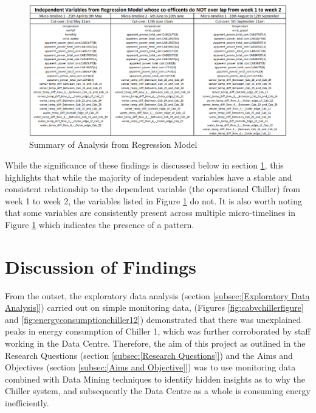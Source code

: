 \documentclass[12pt]{scrartcl}
\begin{document}
\begin{figure}[H]
  \caption{Summary of Analysis from Regression Model}
  \label{fig:regressionresults}
  \centering
    \includegraphics[scale=0.50]{regressionresults}
\end{figure}   

While the significance of these findings is discussed below in section \ref{sec:[Discussion of Findings]}, this highlights that while the majority of independent variables have a stable and consistent relationship to the dependent variable (the operational Chiller) from week 1 to week 2, the variables listed in Figure \ref{fig:regressionresults} do not. It is also worth noting that some variables are consistently present across multiple micro-timelines in Figure \ref{fig:regressionresults} which indicates the presence of a pattern.              

\section{Discussion of Findings}
\label{sec:[Discussion of Findings]}

From the outset, the exploratory data analysis (section \ref{subsec:[Exploratory Data Analysis]}) carried out on simple monitoring data, (Figures \ref{fig:cabvchillerfigure} and \ref{fig:energyconsumptionchiller12}) demonstrated that there was unexplained peaks in energy consumption of Chiller 1, which was further corroborated by staff working in the Data Centre. Therefore, the aim of this project as outlined in the Research Questions (section \ref{subsec:[Research Questions]}) and the Aims and Objectives (section \ref{subsec:[Aims and Objective]}) was to use monitoring data combined with Data Mining techniques to identify hidden insights as to why the Chiller system, and subsequently the Data Centre as a whole is consuming energy inefficiently. 
\end{document}
